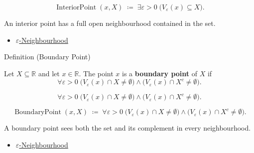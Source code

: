 \begin{remark*}
\[
  \operatorname{InteriorPoint}(x,X)\;\coloneqq\;\exists\varepsilon>0\;\bigl(V_\varepsilon(x)\subseteq X\bigr).
\]
\end{remark*}

\begin{remark*}[Interpretation]
An interior point has a full open neighbourhood contained in the set.
\end{remark*}

\begin{dependencies}
\begin{itemize}
  \item \hyperref[def:epsilon-neighbourhood]{$\varepsilon$-Neighbourhood}
\end{itemize}
\end{dependencies}

\begin{definitionbox}{Definition (Boundary Point)}
\begin{definition}
\label{def:boundary-point-r}
Let $X\subseteq\mathbb{R}$ and let $x\in\mathbb{R}$. The point $x$ is
a \textbf{boundary point} of $X$ if
\[
  \forall\varepsilon>0\;\bigl(V_\varepsilon(x)\cap X\neq\emptyset\bigr)
  \wedge\bigl(V_\varepsilon(x)\cap X^c\neq\emptyset\bigr).
\]
\end{definition}
\end{definitionbox}

\begin{remark*}
\[
  \forall\varepsilon>0\;\bigl(V_\varepsilon(x)\cap X\neq\emptyset\bigr)
  \wedge\bigl(V_\varepsilon(x)\cap X^c\neq\emptyset\bigr).
\]
\end{remark*}

\begin{remark*}
\[
  \operatorname{BoundaryPoint}(x,X)\;\coloneqq\;
  \forall\varepsilon>0\;\bigl(V_\varepsilon(x)\cap X\neq\emptyset\bigr)
  \wedge\bigl(V_\varepsilon(x)\cap X^c\neq\emptyset\bigr).
\]
\end{remark*}

\begin{remark*}[Interpretation]
A boundary point sees both the set and its complement in every
neighbourhood.
\end{remark*}

\begin{dependencies}
\begin{itemize}
  \item \hyperref[def:epsilon-neighbourhood]{$\varepsilon$-Neighbourhood}
\end{itemize}
\end{dependencies}

